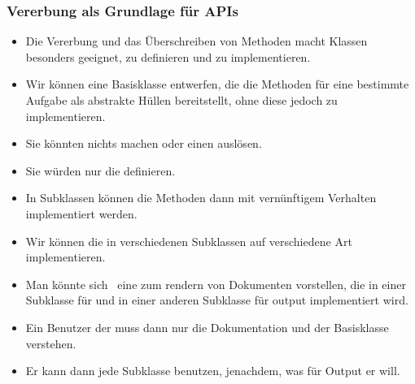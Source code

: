 \documentclass[aspectratio=169,mathserif,notheorems]{beamer}%
\begin{document}
\begin{frame}%
\frametitle{Vererbung als Grundlage für APIs}%
\begin{itemize}%
\item Die Vererbung und das Überschreiben von Methoden macht Klassen besonders geeignet,  zu definieren und zu implementieren.%
%
\item<2-> Wir können eine Basisklasse entwerfen, die die Methoden für eine bestimmte Aufgabe als abstrakte Hüllen bereitstellt, ohne diese jedoch zu implementieren.%
%
\item<3-> Sie könnten nichts machen oder einen  auslösen.%
%
\item<4-> Sie würden nur die  definieren.%
%
\item<5-> In Subklassen können die Methoden dann mit vernünftigem Verhalten implementiert werden.%
%
\item<6-> Wir können die  in verschiedenen Subklassen auf verschiedene Art implementieren.%
%
\item<7-> Man könnte sich \DEzB\ eine  zum rendern von Dokumenten vorstellen, die in einer Subklasse für  und in einer anderen Subklasse für  output implementiert wird.%
%
\item<8-> Ein Benutzer der  muss dann nur die Dokumentation und  der Basisklasse verstehen.%
%
\item<9-> Er kann dann jede Subklasse benutzen, jenachdem, was für Output er will.%
\end{itemize}%
\end{frame}%
%
\end{document}
